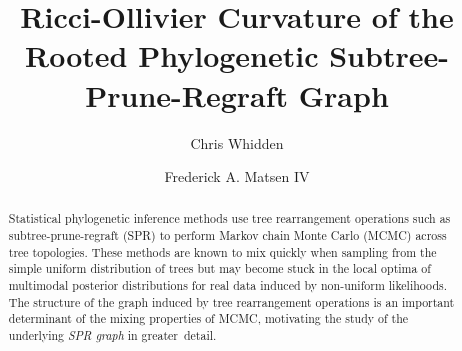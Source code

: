 \documentclass[]{elsarticle}
\begin{document}

\begin{frontmatter}


	\title{Ricci-Ollivier Curvature of the Rooted Phylogenetic Subtree-Prune-Regraft Graph}


	\author{Chris Whidden}

\author{Frederick A. Matsen IV}


\address{Program in Computational Biology, Fred Hutchinson Cancer Research Center, Seattle, WA, USA 98109}

\begin{abstract}
Statistical phylogenetic inference methods use tree rearrangement operations such as subtree-prune-regraft (SPR) to perform Markov chain Monte Carlo (MCMC) across tree topologies.
These methods are known to mix quickly when sampling from the simple uniform distribution of trees but may become stuck in the local optima of multimodal posterior distributions for real data induced by non-uniform likelihoods.
The structure of the graph induced by tree rearrangement operations is an important determinant of the mixing properties of MCMC, motivating the study of the underlying \emph{SPR graph} in greater~detail.


\end{abstract}
\end{frontmatter}
\end{document}
